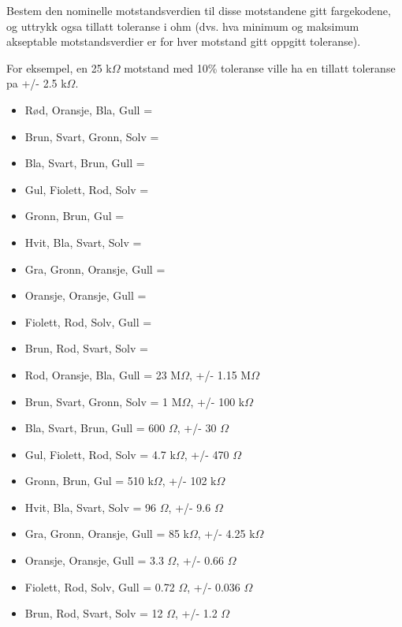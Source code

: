 

Bestem den nominelle motstandsverdien til disse motstandene gitt fargekodene, og uttrykk ogsa tillatt toleranse i ohm (dvs. hva minimum og maksimum akseptable motstandsverdier er for hver motstand gitt oppgitt toleranse).

For eksempel, en 25 k$\Omega$ motstand med 10\% toleranse ville ha en tillatt toleranse pa +/- 2.5 k$\Omega$.

\begin{itemize}
\item{} Rød, Oransje, Bla, Gull = 
\item{} Brun, Svart, Gronn, Solv = 
\item{} Bla, Svart, Brun, Gull = 
\item{} Gul, Fiolett, Rod, Solv = 
\item{} Gronn, Brun, Gul =      
\item{} Hvit, Bla, Svart, Solv =
\item{} Gra, Gronn, Oransje, Gull =
\item{} Oransje, Oransje, Gull =
\item{} Fiolett, Rod, Solv, Gull =
\item{} Brun, Rod, Svart, Solv =
\end{itemize}







\begin{itemize}
\item{} Rod, Oransje, Bla, Gull = 23 M$\Omega$, +/- 1.15 M$\Omega$
\item{} Brun, Svart, Gronn, Solv = 1 M$\Omega$, +/- 100 k$\Omega$
\item{} Bla, Svart, Brun, Gull = 600 $\Omega$, +/- 30 $\Omega$
\item{} Gul, Fiolett, Rod, Solv = 4.7 k$\Omega$, +/- 470 $\Omega$
\item{} Gronn, Brun, Gul = 510 k$\Omega$, +/- 102 k$\Omega$
\item{} Hvit, Bla, Svart, Solv = 96 $\Omega$, +/- 9.6 $\Omega$
\item{} Gra, Gronn, Oransje, Gull = 85 k$\Omega$, +/- 4.25 k$\Omega$
\item{} Oransje, Oransje, Gull = 3.3 $\Omega$, +/- 0.66 $\Omega$
\item{} Fiolett, Rod, Solv, Gull = 0.72 $\Omega$, +/- 0.036 $\Omega$
\item{} Brun, Rod, Svart, Solv = 12 $\Omega$, +/- 1.2 $\Omega$
\end{itemize}

